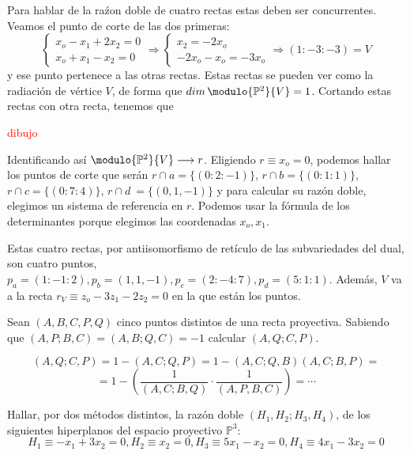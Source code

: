 \begin{sol}
    Para hablar de la ra\'zon doble de cuatro rectas estas deben ser concurrentes. Veamos el punto de corte de las dos primeras:
    $$\begin{cases}
        x_o - x_1 + 2x_2 = 0 \\ x_o + x_1 - x_2 = 0
    \end{cases} \Rightarrow \begin{cases}
        x_2 = -2x_o \\ -2x_o -x_o=-3x_o
    \end{cases} \Rightarrow (1:-3:-3)=V$$
    y ese punto pertenece a las otras rectas. Estas rectas se pueden ver como la radiaci\'on de v\'ertice $V$, de forma que $dim \, \modulo{\mathbb P^2}{V} = 1$. Cortando estas rectas con otra recta, tenemos que

    \textcolor{red}{dibujo}

    Identificando as\'i $\modulo{\mathbb P^2}{V} \longrightarrow r$. Eligiendo $r \equiv x_o = 0$, podemos hallar los puntos de corte que ser\'an $r\cap a = \{(0:2:-1)\}$, $r\cap b=\{(0:1:1)\}$, $r\cap c = \{(0:7:4)\}$, $r\cap d\ = \{(0,1,-1)\}$ y para calcular su raz\'on doble, elegimos un sistema de referencia en $r$. Podemos usar la f\'ormula de los determinantes porque elegimos las coordenadas $x_o,x_1$.

    Estas cuatro rectas, por antiisomorfismo de ret\'iculo de las subvariedades del dual, son cuatro puntos, $p_a=(1:-1:2), p_b=(1,1,-1), p_c = (2:-4:7), p_d = (5:1:1)$. Adem\'as, $V$ va a la recta $r_V \equiv z_o-3z_1-2z_2=0$ en la que est\'an los puntos.   
\end{sol}
\begin{ejer}
    [19] Sean $(A, B, C, P, Q)$ cinco puntos distintos de una recta proyectiva. Sabiendo que $(A, P; B, C) = (A, B; Q, C) = -1$ calcular $(A, Q; C, P)$.
\end{ejer}  
\begin{sol}
    $$(A, Q; C, P)=1-(A, C ; Q ,P) =1-(A,C;Q,B)(A,C;B,P) =$$ $$ =1- \left(\dfrac{1}{(A,C;B,Q)} \cdot \dfrac{1}{(A, P,B,C)}\right) = \cdots $$
\end{sol}
\begin{ejer}
    [14] Hallar, por dos m\'etodos distintos, la raz\'on doble $(H_1, H_2; H_3, H_4)$, de los siguientes hiperplanos del espacio proyectivo $\mathbb P^3$: 
    $$H_1 \equiv -x_1 + 3x_2 = 0, H_2 \equiv x_2 = 0, H_3 \equiv 5x_1 - x_2 = 0, H_4 \equiv 4x_1 - 3x_2 = 0$$
\end{ejer}
